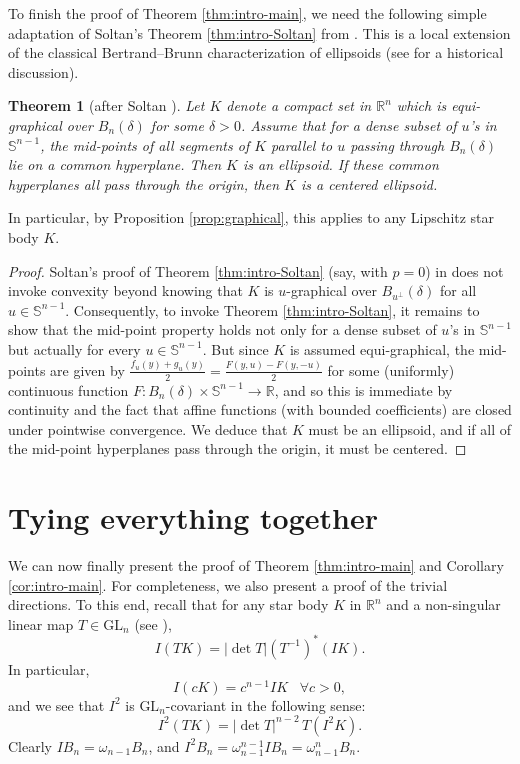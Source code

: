 \documentclass[11pt]{article}
\newtheorem{thm}{Theorem}[section]
\theoremstyle{definition}
\theoremstyle{proof}
\DeclareMathOperator{\+}{\mathop{\tilde{+}}}
\newcommand{\GL}{\textrm{GL}}
\newcommand{\R}{\mathbb{R}}
\renewcommand{\S}{\mathbb{S}}
\numberwithin{equation}{section}
\numberwithin{equation}{section}
\begin{document}
To finish the proof of Theorem \ref{thm:intro-main}, we need the following simple adaptation of Soltan's Theorem \ref{thm:intro-Soltan} from \cite{Soltan-EllipsoidViaMidpoints}. This is a local extension of the classical Bertrand--Brunn characterization of ellipsoids (see \cite[Section 8]{Soltan-EllipsoidsSurvey} for a historical discussion).
\begin{thm}[after Soltan \cite{Soltan-EllipsoidViaMidpoints}] \label{thm:Soltan}
Let $K$ denote a compact set in $\R^n$ which is equi-graphical over $B_n(\delta)$ for some $\delta > 0$. Assume that for a dense subset of $u$'s in $\S^{n-1}$, the mid-points of all segments of $K$ parallel to $u$ passing through $B_n(\delta)$  lie on a common hyperplane. Then $K$ is an ellipsoid. If these common hyperplanes all pass through the origin, then $K$ is a centered ellipsoid. 
\end{thm}
In particular, by Proposition \ref{prop:graphical}, this applies to any Lipschitz star body $K$. 
\begin{proof}
Soltan's proof of Theorem \ref{thm:intro-Soltan} (say, with $p=0$) in \cite[Section 7]{Soltan-EllipsoidViaMidpoints} does not invoke convexity beyond knowing that $K$ is $u$-graphical over $B_{u^{\perp}}(\delta)$ for all $u \in \S^{n-1}$. Consequently, to invoke Theorem \ref{thm:intro-Soltan}, it remains to show that the mid-point property holds not only for a dense subset of $u$'s in $\S^{n-1}$ but actually for every $u \in \S^{n-1}$. But since $K$ is assumed equi-graphical, the mid-points are given by $\frac{f_u(y) + g_u(y)}{2} = \frac{F(y,u) - F(y,-u)}{2}$ for some (uniformly) continuous function $F : B_n(\delta) \times \S^{n-1} \rightarrow \R$, and so this is immediate by continuity and the fact that affine functions (with bounded coefficients) are closed under pointwise convergence. We deduce that $K$ must be an ellipsoid, and if all of the mid-point hyperplanes pass through the origin, it must be centered. 
\end{proof}



\section{Tying everything together} \label{sec:proof}

We can now finally present the proof of Theorem \ref{thm:intro-main} and Corollary \ref{cor:intro-main}. For completeness, we also present a proof of the trivial directions. To this end, recall that for any star body $K$ in $\R^n$ and  a non-singular linear map $T \in \GL_n$ (see \cite[Theorem 8.1.6]{GardnerGeometricTomography2ndEd}),
\begin{equation} \label{eq:ITK}
I(T K) = |\det T| (T^{-1})^*(I K) .
\end{equation}
In particular,
\[
I(c K) = c^{n-1} I K \;\;\; \forall c > 0 ,
\]
and we see that $I^2$ is $\GL_n$-covariant in the following sense:
\[
I^2 (T K) = |\det T|^{n-2} \, T(I^2 K) .
\]
Clearly $I B_n = \omega_{n-1} B_n$, and $I^2 B_n = \omega_{n-1}^{n-1} I B_n = \omega_{n-1}^n B_n$.
\end{document}
